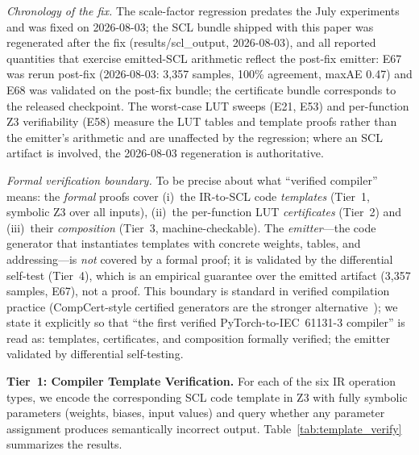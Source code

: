 \documentclass[journal,onecolumn]{IEEEtran}
\begin{document}
\begin{enumerate}
         \textit{Chronology of the fix.} The scale-factor regression
         predates the July experiments and was fixed on 2026-08-03; the
         SCL bundle shipped with this paper was regenerated after the
         fix (results/scl\_output, 2026-08-03), and all reported
         quantities that exercise emitted-SCL arithmetic reflect the
         post-fix emitter: E67 was rerun post-fix (2026-08-03: 3{,}357
         samples, 100\% agreement, maxAE 0.47) and E68 was validated on
         the post-fix bundle; the certificate bundle corresponds to the
         released checkpoint. The worst-case LUT sweeps (E21, E53) and
         per-function Z3 verifiability (E58) measure the LUT tables and
         template proofs rather than the emitter's arithmetic and are
         unaffected by the regression; where an SCL artifact is
         involved, the 2026-08-03 regeneration is authoritative.

        \textit{Formal verification boundary.} To be precise about what
        ``verified compiler'' means: the \emph{formal} proofs cover
        (i)~the IR-to-SCL code \emph{templates} (Tier~1, symbolic Z3
        over all inputs), (ii)~the per-function LUT \emph{certificates}
        (Tier~2) and (iii)~their \emph{composition} (Tier~3,
        machine-checkable). The \emph{emitter}---the code generator that
        instantiates templates with concrete weights, tables, and
        addressing---is \emph{not} covered by a formal proof; it is
        validated by the differential self-test (Tier~4), which is an
        empirical guarantee over the emitted artifact (3{,}357 samples,
        E67), not a proof. This boundary is standard in verified
        compilation practice (CompCert-style certified generators are
        the stronger alternative~\cite{leroy2009compcert}); we state it
        explicitly so that ``the first verified PyTorch-to-IEC~61131-3
        compiler'' is read as: templates, certificates, and composition
        formally verified; the emitter validated by differential
        self-testing.
\end{enumerate}

\vspace{4pt}
\noindent\textbf{Tier~1: Compiler Template Verification.}
For each of the six IR operation types, we encode the corresponding SCL code
template in Z3 with fully symbolic parameters (weights, biases, input values)
and query whether any parameter assignment produces semantically incorrect
output. Table~\ref{tab:template_verify} summarizes the results.
\end{document}

